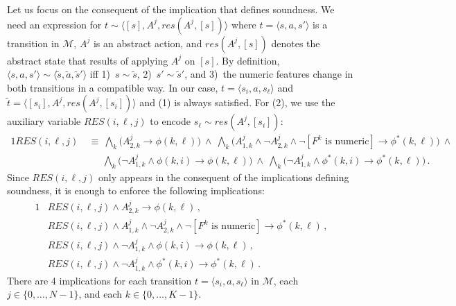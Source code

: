 \documentclass[10pt]{article}
\newcommand{\tup}[1]{\langle #1 \rangle}
\newcommand{\M}{\mathcal{M}}
\begin{document}
Let us focus on the consequent of the implication that defines soundness. We need
an expression for $t \sim \tup{[s],A^j,res(A^j,[s])}$ where $t=\tup{s,a,s'}$ is
a transition in $\M$, $A^j$ is an abstract action, and $res(A^j,[s])$ denotes
the abstract state that results of applying $A^j$ on $[s]$.
By definition, $\tup{s,a,s'}\sim\tup{\tilde s,\tilde a,\tilde s'}$ iff
1)~$s\sim\tilde s$, 2)~$s'\sim\tilde s'$, and 3)~the numeric features change
in both transitions in a compatible way.
In our case, $t=\tup{s_i,a,s_\ell}$ and $\tilde t=\tup{[s_i],A^j,res(A^j,[s_i])}$
and (1) is always satisfied.
For (2), we use the auxiliary variable $RES(i,\ell,j)$ to encode $s_\ell\sim res(A^j,[s_i])$:
\begin{alignat}{1}
  RES(i,\ell,j)\
    &\equiv\  \bigwedge_{k} \biggl(A^j_{2,k} \rightarrow \phi(k,\ell)\biggr)\ \land\
              \bigwedge_{k} \biggl(A^j_{1,k} \land \neg A^j_{2,k} \land \neg [\text{$F^k$ is numeric}] \rightarrow \phi^*(k,\ell)\biggr)\ \land \\
    &\quad\ \ \bigwedge_{k} \biggl(\neg A^j_{1,k} \land \phi(k,i) \rightarrow \phi(k,\ell)\biggr)\ \land\
              \bigwedge_{k} \biggl(\neg A^j_{1,k} \land \phi^*(k,i) \rightarrow \phi^*(k,\ell)\biggr)\,.
\end{alignat}
Since $RES(i,\ell,j)$ only appears in the consequent of the implications defining soundness,
it is enough to enforce the following implications:
\begin{alignat}{1}
  &RES(i,\ell,j) \land A^j_{2,k} \rightarrow \phi(k,\ell)\,, \\
  &RES(i,\ell,j) \land A^j_{1,k} \land \neg A^j_{2,k} \land \neg [\text{$F^k$ is numeric}] \rightarrow \phi^*(k,\ell)\,, \\
  &RES(i,\ell,j) \land \neg A^j_{1,k} \land \phi(k,i) \rightarrow \phi(k,\ell)\,, \\
  &RES(i,\ell,j) \land \neg A^j_{1,k} \land \phi^*(k,i) \rightarrow \phi^*(k,\ell)\,.
\end{alignat}
There are 4 implications for each transition $t=\tup{s_i,a,s_\ell}$ in $\M$,
each $j\in\{0,\ldots,N-1\}$, and each $k\in\{0,\ldots,K-1\}$.
\end{document}
